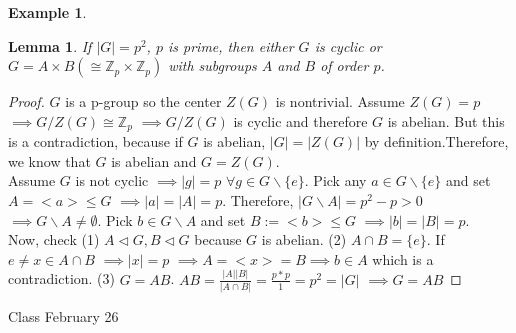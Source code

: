 \documentclass[11pt]{article}
\newtheorem{lem}[thm]{Lemma}
\theoremstyle{definition}
\newtheorem{example}[thm]{Example}
\numberwithin{equation}{section}
\newcommand{\Z}{\mathbb{Z}}
\begin{document}
\begin{enumerate}
\begin{example}
\end{example}
\begin{lem}
If $|G| = p^{2}$, $p$ is prime, then either $G$ is cyclic or $G = A \times B (\cong \Z_p \times \Z_p)$ with subgroups $A$ and $B$ of order $p$.
\end{lem}
\begin{proof}
$G$ is a p-group so the center $Z(G)$ is nontrivial. Assume $Z(G) = p$ $\implies G/Z(G) \cong \Z_p$ $\implies G/Z(G)$ is cyclic and therefore $G$ is abelian. But this is a contradiction, because if $G$ is abelian, $|G| = |Z(G)|$ by definition.Therefore, we know that $G$ is abelian and $G = Z(G)$.\\
Assume $G$ is not cyclic $\implies |g| = p$ $\forall g \in G \smallsetminus \{e\}$. Pick any $a \in G \smallsetminus \{e\}$ and set $A = <a> \leq G$ $\implies |a| = |A| = p$. Therefore, $|G \smallsetminus A| = p^{2} - p > 0$ $\implies G \smallsetminus A \neq \emptyset$. Pick $b \in G \smallsetminus A$ and set $B := <b> \leq G$ $\implies |b| = |B| = p$.\\
Now, check (1) $A \vartriangleleft G, B \vartriangleleft G$ because $G$ is abelian. (2) $A \cap B = \{e\}$. If $e \neq x \in A \cap B$ $\implies |x| = p$ $\implies A = <x> = B \implies b \in A$ which is a contradiction. (3) $G = AB$. $AB = \frac{|A||B|}{|A \cap B|} = \frac{p*p}{1} = p^{2} = |G|$ $\implies G = AB$
\end{proof}
\end{enumerate}

\begin{center}
{\sf\LARGE Class February 26}
\end{center}
\end{document}
